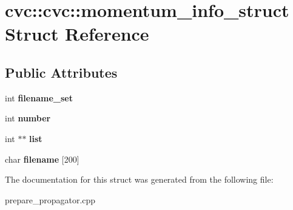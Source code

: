 \hypertarget{structcvc_1_1cvc_1_1momentum__info__struct}{\section{cvc\-:\-:cvc\-:\-:momentum\-\_\-info\-\_\-struct Struct Reference}
\label{structcvc_1_1cvc_1_1momentum__info__struct}
}
\subsection*{Public Attributes}
\begin{DoxyCompactItemize}
\item 
\hypertarget{structcvc_1_1cvc_1_1momentum__info__struct_a6a31d7eced8a5f88553613d946fcf429}{int {\bfseries filename\-\_\-set}}\label{structcvc_1_1cvc_1_1momentum__info__struct_a6a31d7eced8a5f88553613d946fcf429}

\item 
\hypertarget{structcvc_1_1cvc_1_1momentum__info__struct_a93f5d236ffc2ba8d0dd081851cb0fb40}{int {\bfseries number}}\label{structcvc_1_1cvc_1_1momentum__info__struct_a93f5d236ffc2ba8d0dd081851cb0fb40}

\item 
\hypertarget{structcvc_1_1cvc_1_1momentum__info__struct_a70be9874e3493003a16e145cca8928ef}{int $\ast$$\ast$ {\bfseries list}}\label{structcvc_1_1cvc_1_1momentum__info__struct_a70be9874e3493003a16e145cca8928ef}

\item 
\hypertarget{structcvc_1_1cvc_1_1momentum__info__struct_afd7fb18188e7228f4b873ea5118078c9}{char {\bfseries filename} \mbox{[}200\mbox{]}}\label{structcvc_1_1cvc_1_1momentum__info__struct_afd7fb18188e7228f4b873ea5118078c9}

\end{DoxyCompactItemize}


The documentation for this struct was generated from the following file\-:\begin{DoxyCompactItemize}
\item 
prepare\-\_\-propagator.\-cpp\end{DoxyCompactItemize}
